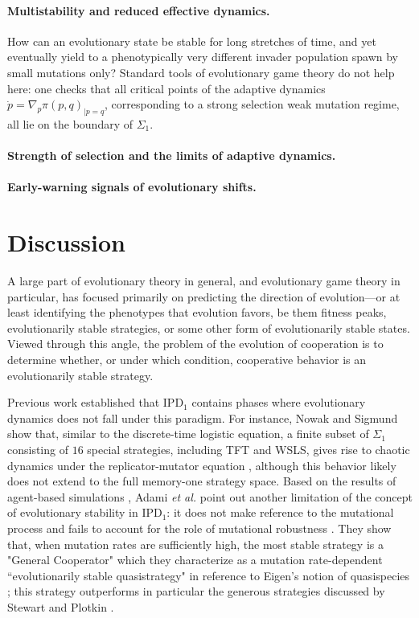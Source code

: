 \documentclass[12pt]{article}
\def\IPD{\textrm{IPD}}
\def\IPD1{\textrm{IPD}_1}
\begin{document}
\paragraph*{Multistability and reduced effective dynamics.}

How can an evolutionary state be stable for long stretches of time, and yet eventually yield to a phenotypically very different invader population spawn by small mutations only? Standard tools of evolutionary game theory do not help here: one checks that all critical points of the adaptive dynamics $\dot{p} = \nabla_p \pi(p, q)_{\vert p = q}$, corresponding to a strong selection weak mutation regime, all lie on the boundary of $\Sigma_1$. 


\paragraph*{Strength of selection and the limits of adaptive dynamics.}



\paragraph*{Early-warning signals of evolutionary shifts.}

\section*{Discussion}

A large part of evolutionary theory in general, and evolutionary game theory in particular, has focused primarily on predicting the direction of evolution---or at least identifying the phenotypes that evolution favors, be them fitness peaks, evolutionarily stable strategies, or some other form of evolutionarily stable states. Viewed through this angle, the problem of the evolution of cooperation is to determine whether, or under which condition, cooperative behavior is an evolutionarily stable strategy. 

Previous work established that $\IPD1$ contains phases where evolutionary dynamics does not fall under this paradigm. For instance, Nowak and Sigmund show that, similar to the discrete-time logistic equation, a finite subset of $\Sigma_1$ consisting of $16$ special strategies, including TFT and WSLS, gives rise to chaotic dynamics under the replicator-mutator equation \cite{nowak_chaos_1993}, although this behavior likely does not extend to the full memory-one strategy space. Based on the results of agent-based simulations \cite{iliopoulos_critical_2010}, Adami \emph{et al.} point out another limitation of the concept of evolutionary stability in $\IPD1$: it does not make reference to the mutational process and fails to account for the role of mutational robustness \cite{adami_evolutionary_2016}. They show that, when mutation rates are sufficiently high, the most stable strategy is a "General Cooperator" which they characterize as a mutation rate-dependent ``evolutionarily stable quasistrategy" in reference to Eigen's notion of quasispecies \cite{eigen_molecular_1988}; this strategy outperforms in particular the generous strategies discussed by Stewart and Plotkin \cite{stewart_extortion_2013}. 
\end{document}
